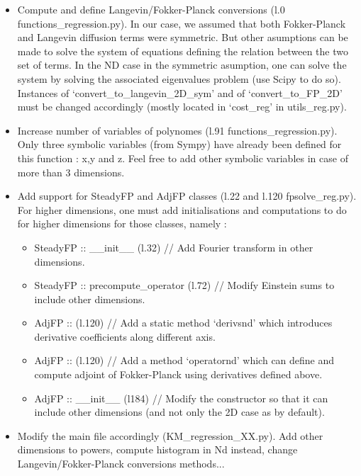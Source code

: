 \documentclass[A4paper]{article}
\begin{document}
\begin{itemize}
\item Compute and define Langevin/Fokker-Planck conversions (l.0 functions\_regression.py). In our case, we assumed that both Fokker-Planck and Langevin diffusion terms were symmetric. But other asumptions can be made to solve the system of equations defining the relation between the two set of terms. In the ND case in the symmetric asumption, one can solve the system by solving the associated eigenvalues problem (use Scipy to do so). Instances of `convert\_to\_langevin\_2D\_sym' and of `convert\_to\_FP\_2D' must be changed accordingly (mostly located in `cost\_reg' in utils\_reg.py). 

\item Increase number of variables of polynomes (l.91 functions\_regression.py). Only three symbolic variables (from Sympy) have already been defined for this function : x,y and z. Feel free to add other symbolic variables in case of more than 3 dimensions.

\item Add support for SteadyFP and AdjFP classes (l.22 and l.120 fpsolve\_reg.py). For higher dimensions, one must add initialisations and computations to do for higher dimensions for those classes, namely :

\begin{itemize}
\item SteadyFP :: \_\_init\_\_ (l.32) // Add Fourier transform in other dimensions.

\item SteadyFP :: precompute\_operator (l.72) // Modify Einstein sums to include other dimensions.

\item AdjFP :: (l.120) // Add a static method `derivsnd' which introduces derivative coefficients along different axis.

\item AdjFP :: (l.120) // Add a method `operatornd' which can define and compute adjoint of Fokker-Planck using derivatives defined above.

\item AdjFP :: \_\_init\_\_ (l184) // Modify the constructor so that it can include other dimensions (and not only the 2D case as by default).
\end{itemize}

\item Modify the main file accordingly (KM\_regression\_XX.py). Add other dimensions to powers, compute histogram in Nd instead, change Langevin/Fokker-Planck conversions methods...
\end{itemize}
\end{document}
